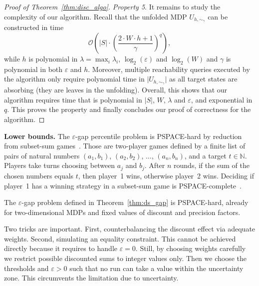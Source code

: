 \documentclass{llncs}
\newcommand{\states}{\ensuremath{S} }
\newcommand{\discount}{\ensuremath{\lambda} }
\newcommand{\nat}{\ensuremath{\mathbb{N}} }
\newcommand\PSPACE{\textrm{\sf PSPACE}}
\begin{document}
\begin{proof}[Proof of Theorem~\ref{thm:disc_algo}]
\textit{Property 5}. It remains to study the complexity of our algorithm. Recall that the unfolded MDP $U_{h,\sim_{\gamma}}$ can be constructed in time
\begin{equation*}
\mathcal{O}\left( \vert \states \vert \cdot \left(\dfrac{2\cdot W \cdot h + 1}{\gamma} \right) ^{q} \right),
\end{equation*}
while $h$ is polynomial in $\discount = \max_{i} \discount_{i}$, $\log_{2}(\varepsilon)$ and $\log_{2}(W)$ and $\gamma$ is polynomial in both $\varepsilon$ and $h$. Moreover, multiple reachability queries executed by the algorithm only require polynomial time in $\vert U_{h,\sim_{\gamma}}\vert$ as all target states are absorbing (they are leaves in the unfolding). Overall, this shows that our algorithm requires time that is polynomial in $\vert \states \vert$, $W$, $\discount$ and $\varepsilon$, and exponential in $q$. This proves the property and finally concludes our proof of correctness for the algorithm.
\end{proof}



\smallskip\noindent\textbf{Lower bounds.} The $\varepsilon$-gap percentile problem is \PSPACE-hard by reduction from subset-sum games~\cite{DBLP:journals/tcs/Travers06}. Those are two-player games defined by a finite list of pairs of natural numbers $(a_{1}, b_{1})$, $(a_{2}, b_{2})$, $\ldots{}$, $(a_{n}, b_{n})$, and a target $t \in \nat$. Players take turns choosing between $a_{j}$ and $b_{j}$. After $n$ rounds, if the sum of the chosen numbers equals $t$, then player~1 wins, otherwise player~2 wins. Deciding if player~1 has a winning strategy in a subset-sum game is \PSPACE-complete~\cite{DBLP:journals/tcs/Travers06}. 



\begin{lemma}
\label{lem:ds_pspace_hard}
The $\varepsilon$-gap problem defined in Theorem~\ref{thm:ds_gap} is \PSPACE-hard, already for two-dimensional MDPs and fixed values of discount and precision factors.
\end{lemma}

Two tricks are important. First, counterbalancing the discount effect via adequate weights. Second, simulating an equality constraint. This cannot be achieved directly because it requires to handle $\varepsilon = 0$. Still, by choosing weights carefully we restrict possible discounted sums to integer values only. Then we choose the thresholds and $\varepsilon > 0$ such that no run can take a value within the uncertainty zone. This circumvents the limitation due to uncertainty.
\end{document}
